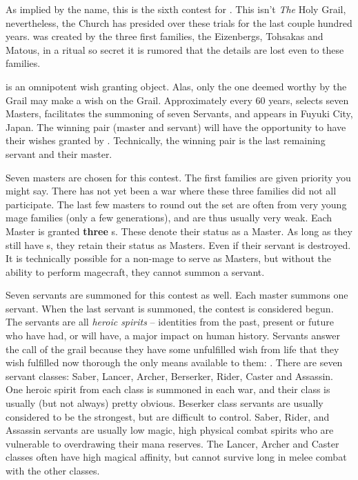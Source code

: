 \documentclass[blue]{FateDarkDawn}
\begin{document}
\name{\bHGW{}}


As implied by the name, this is the sixth contest for \iGrail{\MYname{}}. This isn't \emph{The} Holy Grail, nevertheless, the Church has presided over these trials for the last couple hundred years. \iGrail{\MYname{}} was created by the three first families, the Eizenbergs, Tohsakas and Matous, in a ritual so secret it is rumored that the details are lost even to these families.

\iGrail{\MYname{}} is an omnipotent wish granting object. Alas, only the one deemed worthy by the Grail may make a wish on the Grail. Approximately every 60 years, \iGrail{\MYname{}} selects seven Masters, facilitates the summoning of seven Servants, and appears in Fuyuki City, Japan. The winning pair (master and servant) will have the opportunity to have their wishes granted by \iGrail{\MYname{}}. Technically, the winning pair is the last remaining servant and their master.

Seven masters are chosen for this contest. The first families are given priority you might say. There has not yet been a war where these three families did not all participate. The last few masters to round out the set are often from very young mage families (only a few generations), and are thus usually very weak. Each Master is granted {\bf three} \iCommand{\MYname}s. These denote their status as a Master. As long as they still have \iCommand{\MYname}s, they retain their status as Masters. Even if their servant is destroyed. It is technically possible for a non-mage to serve as Masters, but without the ability to perform magecraft, they cannot summon a servant.

Seven servants are summoned for this contest as well. Each master summons one servant. When the last servant is summoned, the contest is considered begun. The servants are all \emph{heroic spirits} -- identities from the past, present or future who have had, or will have, a major impact on human history. Servants answer the call of the grail because they have some unfulfilled wish from life that they wish fulfilled now thorough the only means available to them: \iGrail{\MYname{}}. There are seven servant classes: Saber, Lancer, Archer, Berserker, Rider, Caster and Assassin. One heroic spirit from each class is summoned in each war, and their class is usually (but not always) pretty obvious. Beserker class servants are usually considered to be the strongest, but are difficult to control. Saber, Rider, and Assassin servants are usually low magic, high physical combat spirits who are vulnerable to overdrawing their mana reserves. The Lancer, Archer and Caster classes often have high magical affinity, but cannot survive long in melee combat with the other classes.
\end{document}
